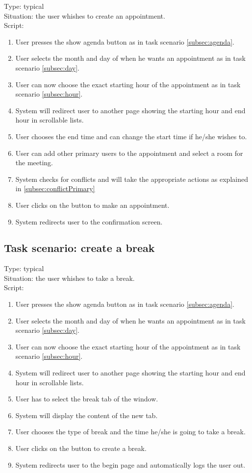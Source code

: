 \documentclass[11pt, a4paper,svglistings]{report}
\begin{document}
Type: typical \\
Situation: the user whishes to create an appointment. \\
Script:
\begin{enumerate}
\item User presses the show agenda button as in task scenario \ref{subsec:agenda}.
\item User selects the month and day of when he wants an appointment as in task scenario \ref{subsec:day}.
\item User can now choose the exact starting hour of the appointment as in task scenario \ref{subsec:hour}.
\item System will redirect user to another page showing the starting hour and end hour in scrollable lists.
\item User chooses the end time and can change the start time if he/she wishes to.
\item User can add other primary users to the appointment and select a room for the meeting.
\item System checks for conflicts and will take the appropriate actions as explained in \ref{subsec:conflictPrimary}
\item User clicks on the button to make an appointment.
\item System redirects user to the confirmation screen.
\end{enumerate}



\subsection{Task scenario: create a break}


Type: typical \\
Situation: the user whishes to take a break. \\
Script:
\begin{enumerate}
\item User presses the show agenda button as in task scenario \ref{subsec:agenda}.
\item User selects the month and day of when he wants an appointment as in task scenario \ref{subsec:day}.
\item User can now choose the exact starting hour of the appointment as in task scenario \ref{subsec:hour}.
\item System will redirect user to another page showing the starting hour and end hour in scrollable lists.
\item User has to select the break tab of the window.
\item System will display the content of the new tab.
\item User chooses the type of break and the time he/she is going to take a break.
\item User clicks on the button to create a break.
\item System redirects user to the begin page and automatically logs the user out. \\ \\
\end{enumerate}
\end{document}
